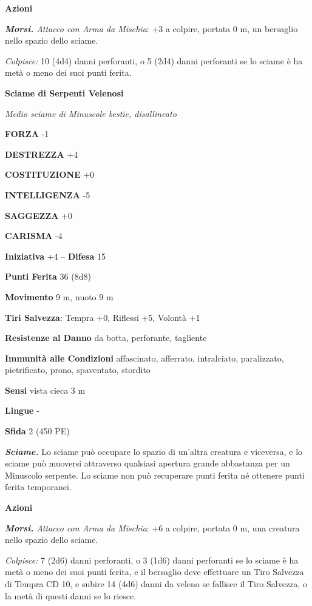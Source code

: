 \begin{multicols}{2}
\textbf{Azioni}

\emph{\textbf{Morsi.} Attacco con Arma da Mischia}: +3 a colpire, portata 0 m, un bersaglio nello spazio dello sciame.

\emph{Colpisce:} 10 (4d4) danni perforanti, o 5 (2d4) danni perforanti se lo sciame è ha metà o meno dei suoi punti ferita.

\medskip\textbf{Sciame di Serpenti Velenosi}

\emph{Medio sciame di Minuscole bestie, disallineato}

\textbf{FORZA} -1

\textbf{DESTREZZA} +4

\textbf{COSTITUZIONE} +0

\textbf{INTELLIGENZA} -5

\textbf{SAGGEZZA} +0

\textbf{CARISMA} -4

\textbf{Iniziativa} +4 -- \textbf{Difesa} 15

\textbf{Punti Ferita} 36 (8d8)

\textbf{Movimento} 9 m, nuoto 9 m

\textbf{Tiri Salvezza}: Tempra +0, Riflessi +5, Volontà +1

\textbf{Resistenze al Danno} da botta, perforante, tagliente

\textbf{Immunità alle Condizioni} affascinato, afferrato, intralciato, paralizzato, pietrificato, prono, spaventato, stordito

\textbf{Sensi} vista cieca 3 m

\textbf{Lingue} -

\textbf{Sfida} 2 (450 PE)

\emph{\textbf{Sciame.}} Lo sciame può occupare lo spazio di un'altra creatura e viceversa, e lo sciame può muoversi attraverso qualsiasi apertura grande abbastanza per un Minuscolo serpente. Lo sciame non può recuperare punti ferita né ottenere punti ferita temporanei.

\textbf{Azioni}

\emph{\textbf{Morsi.} Attacco con Arma da Mischia}: +6 a colpire, portata 0 m, una creatura nello spazio dello sciame.

\emph{Colpisce:} 7 (2d6) danni perforanti, o 3 (1d6) danni perforanti se lo sciame è ha metà o meno dei suoi punti ferita, e il bersaglio deve effettuare un Tiro Salvezza di Tempra CD 10, e subire 14 (4d6) danni da veleno se fallisce il Tiro Salvezza, o la metà di questi danni se lo riesce.


\end{multicols}

